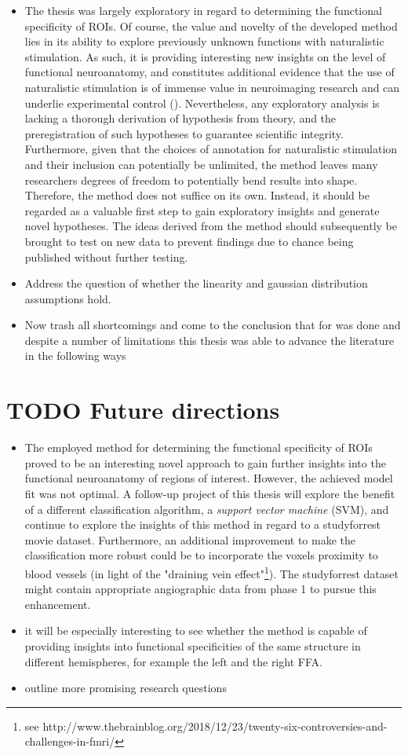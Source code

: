 \documentclass[a4paper, 12pt]{scrreprt}
\begin{document}
\begin{itemize}
	\item The thesis was largely exploratory in regard to determining the functional specificity of ROIs. Of course, the value and novelty of the developed method lies in its ability to explore previously unknown functions with naturalistic stimulation. As such, it is providing interesting new insights on the level of functional neuroanatomy, and constitutes additional evidence that the use of naturalistic stimulation is of immense value in neuroimaging research and can underlie experimental control (\cite{hasson2004intersubject}). Nevertheless, any exploratory analysis is lacking a thorough derivation of hypothesis from theory, and the preregistration of such hypotheses to guarantee scientific integrity. Furthermore, given that the choices of annotation for naturalistic stimulation and their inclusion can potentially be unlimited, the method leaves many researchers degrees of freedom to potentially bend results into shape. Therefore, the method does not suffice on its own. Instead, it should be regarded as a valuable first step to gain exploratory insights and generate novel hypotheses. The ideas derived from the method should subsequently be brought to test on new data to prevent findings due to chance being published without further testing. 
	\item Address the question of whether the linearity and gaussian distribution assumptions hold.
	\item Now trash all shortcomings and come to the conclusion that for was done and despite a number of limitations this thesis was able to advance the literature in the following ways
\end{itemize}

\section{TODO Future directions}
\begin{itemize}
	\item The employed method for determining the functional specificity of ROIs proved to be an interesting novel approach to gain further insights into the functional neuroanatomy of regions of interest. However, the achieved model fit was not optimal. A follow-up project of this thesis will explore the benefit of a different classification algorithm, a \textit{support vector machine} (SVM), and continue to explore the insights of this method in regard to a studyforrest movie dataset. Furthermore, an additional improvement to make the classification more robust could be to incorporate the voxels proximity to blood vessels (in light of the "draining vein effect"\footnote{see http://www.thebrainblog.org/2018/12/23/twenty-six-controversies-and-challenges-in-fmri/}). The studyforrest dataset might contain appropriate angiographic data from phase 1 to pursue this enhancement. 
	\item it will be especially interesting to see whether the method is capable of providing insights into functional specificities of the same structure in different hemispheres, for example the left and the right FFA.
	\item outline more promising research questions 
\end{itemize}
\end{document}
